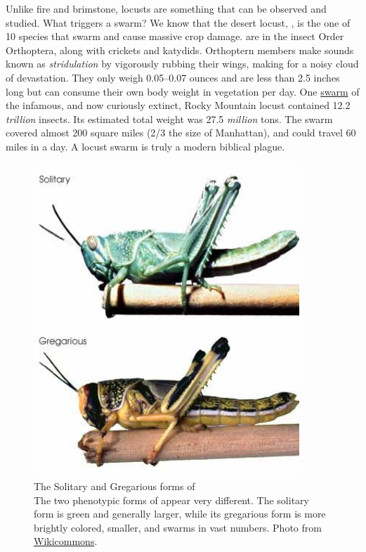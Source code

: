   Unlike fire and brimstone, locusts are something that can be observed and studied. What triggers a swarm? We know that the desert locust, \locusts{}, is the one of 10 species that swarm and cause massive crop damage. \locusts{} are in the insect Order Orthoptera, along with crickets and katydids. Orthoptern members make sounds known as \textit{stridulation} by vigorously rubbing their wings, making for a noisy cloud of devastation. They only weigh 0.05--0.07 ounces and are less than 2.5 inches long but can consume their own body weight in vegetation per day. One \href{http://animaldiversity.ummz.umich.edu/site/accounts/information/Melanoplus_spretus.html}{swarm} of the infamous, and now curiously extinct, Rocky Mountain locust contained 12.2 \textit{trillion} insects. Its estimated total weight was 27.5 \textit{million} tons. The swarm covered almost 200 square miles (2/3 the size of Manhattan), and could travel 60 miles in a day. A locust swarm is truly a modern biblical plague.

  \begin{figure} %
    \centering 
    \includegraphics[width=10cm,keepaspectratio]{Figures/Intro/DesertLocust.jpeg}
    \caption[The Solitary and Gregarious forms of \locusts{}]
    {
      The Solitary and Gregarious forms of \locusts{}\\[0.25cm]
      The two phenotypic forms of \locusts{} appear very different. The solitary form is green and generally larger, while its gregarious form is more brightly colored, smaller, and swarms in vast numbers. Photo from \href{http://www.wikicommons.com}{Wikicommons}.
      }
    \label{Intro:fig:Locust}
    \end{figure}

